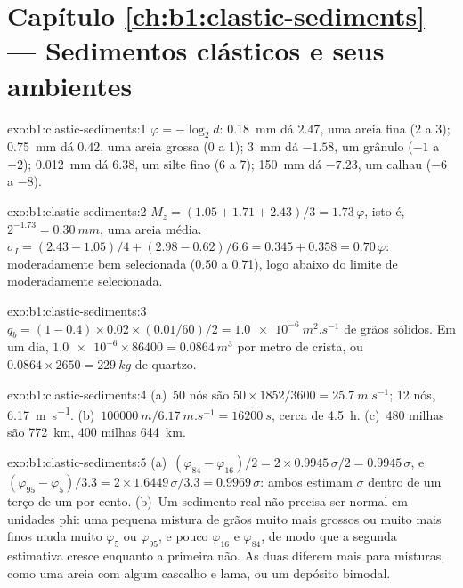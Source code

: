 \section*{Capítulo \ref{ch:b1:clastic-sediments} --- Sedimentos clásticos e seus ambientes}

\begin{solution}{exo:b1:clastic-sediments:1}
$\varphi = -\log_2 d$: \qty{0.18}{mm} dá $2.47$, uma areia fina (2 a 3); \qty{0.75}{mm} dá $0.42$, uma areia grossa (0 a 1); \qty{3}{mm} dá $-1.58$, um grânulo ($-1$ a $-2$); \qty{0.012}{mm} dá $6.38$, um silte fino (6 a 7); \qty{150}{mm} dá $-7.23$, um calhau ($-6$ a $-8$).
\end{solution}

\begin{solution}{exo:b1:clastic-sediments:2}
$M_z = (1.05 + 1.71 + 2.43)/3 = 1.73\,\varphi$, isto é, $2^{-1.73} =
\qty{0.30}{mm}$, uma areia média. $\sigma_I = (2.43 - 1.05)/4 + (2.98 - 0.62)/6.6
= 0.345 + 0.358 = 0.70\,\varphi$: moderadamente bem selecionada (0.50 a 0.71), logo abaixo do limite de moderadamente selecionada.
\end{solution}

\begin{solution}{exo:b1:clastic-sediments:3}
$q_b = (1 - 0.4) \times 0.02 \times (\num{0.01}/60)/2 = \qty{1.0e-6}{m^2.s^{-1}}$
de grãos sólidos. Em um dia, $\num{1.0e-6} \times 86400 = \qty{0.0864}{m^3}$ por
metro de crista, ou $0.0864 \times 2650 = \qty{229}{kg}$ de quartzo.
\end{solution}

\begin{solution}{exo:b1:clastic-sediments:4}
(a)~50 nós são $50 \times 1852/3600 = \qty{25.7}{m.s^{-1}}$; 12 nós, \qty{6.17}{m.s^{-1}}. (b)~$\qty{100000}{m}/\qty{6.17}{m.s^{-1}} =
\qty{16200}{s}$, cerca de \qty{4.5}{h}. (c)~480 milhas são \qty{772}{km}, 400 milhas
\qty{644}{km}.
\end{solution}

\begin{solution}{exo:b1:clastic-sediments:5}
(a)~$(\varphi_{84} - \varphi_{16})/2 = 2 \times 0.9945\,\sigma/2 =
0.9945\,\sigma$, e $(\varphi_{95} - \varphi_5)/3.3 = 2 \times
1.6449\,\sigma/3.3 = 0.9969\,\sigma$: ambos estimam $\sigma$ dentro de um terço de um por cento. (b)~Um sedimento real não precisa ser normal em unidades phi: uma pequena mistura de grãos muito mais grossos ou muito mais finos muda muito $\varphi_5$ ou $\varphi_{95}$, e pouco $\varphi_{16}$ e $\varphi_{84}$, de modo que a segunda estimativa cresce enquanto a primeira não. As duas diferem mais para misturas, como uma areia com algum cascalho e lama, ou um depósito bimodal.
\end{solution}

